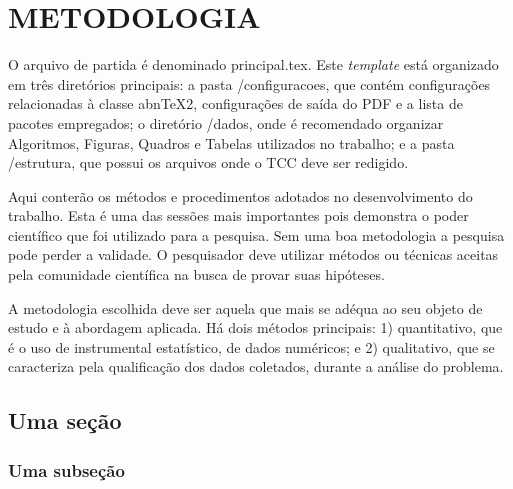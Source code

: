 
\chapter{METODOLOGIA}
\label{chap:metodologia}

O arquivo de partida é denominado {\ttfamily principal.tex}. Este \emph{template} está organizado em três diretórios principais: a pasta {\ttfamily /configuracoes}, que contém configurações relacionadas à classe abn\TeX{}2, configurações de saída do PDF e a lista de pacotes empregados; o diretório {\ttfamily /dados}, onde é recomendado organizar Algoritmos, Figuras, Quadros e Tabelas utilizados no trabalho; e a pasta {\ttfamily /estrutura}, que possui os arquivos onde o TCC deve ser redigido.

Aqui conterão os métodos e procedimentos adotados no desenvolvimento do trabalho. Esta é uma das sessões mais importantes pois demonstra o poder científico que foi utilizado para a pesquisa. Sem uma boa metodologia a pesquisa pode perder a validade. O pesquisador deve utilizar métodos ou técnicas aceitas pela comunidade científica na busca de provar suas hipóteses.

A metodologia escolhida deve ser aquela que mais se adéqua ao seu objeto de estudo e à abordagem aplicada. Há dois métodos principais: 1) quantitativo, que é o uso de instrumental estatístico, de dados numéricos; e 2) qualitativo, que se caracteriza pela qualificação dos dados coletados, durante a análise do problema.

\section{Uma seção}
\lipsum[1]


\subsection{Uma subseção}
\lipsum[1]